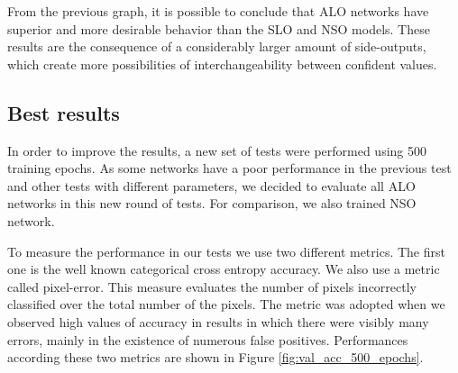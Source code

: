 From the previous graph, it is possible to conclude that ALO networks have superior and more desirable behavior than the SLO and NSO models. These results are the consequence of a considerably larger amount of side-outputs, which create more possibilities of interchangeability between confident values.

\subsection{Best results}

In order to improve the results, a new set of tests were performed using 500 training epochs. As some networks have a poor performance in the previous test and other tests with different parameters, we decided to evaluate all ALO networks in this new round of tests. For comparison, we also trained NSO network.

To measure the performance in our tests we use two different metrics. The first one is the well known categorical cross entropy accuracy.
We also use a metric called pixel-error. This measure evaluates the number of pixels incorrectly classified over the total number of the pixels. The metric was adopted when we observed high values of accuracy in results in which there were visibly many errors, mainly in the existence of numerous false positives. Performances according these two metrics are shown in Figure \ref{fig:val_acc_500_epochs}.

